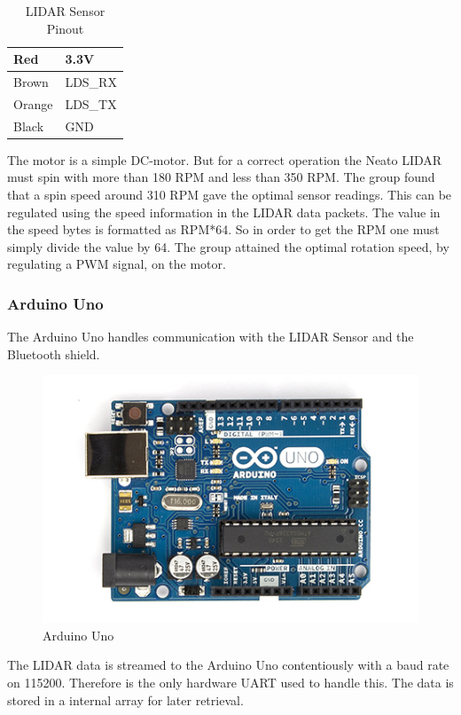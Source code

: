 \begin{table}[H]
\centering
\begin{tabular}{|l|l|}
\hline
Red & 3.3V \\ \hline
Brown & LDS\_RX \\ \hline
Orange & LDS\_TX \\ \hline
Black & GND \\ \hline
\end{tabular}
\caption{LIDAR Sensor Pinout}
\label{tab:lidars}
\end{table}
The motor is a simple DC-motor. But for a correct operation the Neato LIDAR must spin with more than 180 RPM and less than 350 RPM. The group found that a spin speed around 310 RPM gave the optimal sensor readings. This can be regulated using the speed information in the LIDAR data packets. The value in the speed bytes is formatted as RPM*64. So in order to get the RPM one must simply divide the value by 64. The group attained the optimal rotation speed, by regulating a PWM signal, on the motor. 

\subsubsection{Arduino Uno}
The Arduino Uno\cite{ArduinoUno} handles communication with the LIDAR Sensor and the Bluetooth shield.
\begin{figure}[H]
\centering
\includegraphics[scale=1]{billeder/ArduinoUno}
\caption{Arduino Uno}
\label{fig:ArduinoUno}
\end{figure}

The LIDAR data is streamed to the Arduino Uno contentiously with a baud rate on 115200. Therefore is the only hardware UART used to handle this. The data is stored in a internal array for later retrieval.

